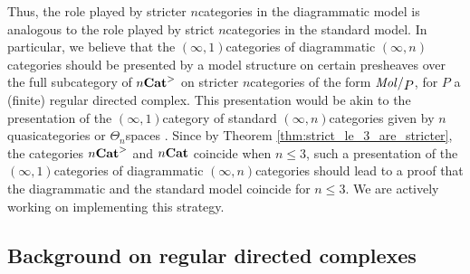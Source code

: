 \noindent Thus, the role played by stricter \( n \)\nbd categories in the diagrammatic model is analogous to the role played by strict \( n \)\nbd categories in the standard model.
In particular, we believe that the \( (\infty, 1) \)\nbd categories of diagrammatic \( (\infty, n) \)\nbd categories should be presented by a model structure on certain presheaves over the full subcategory of \( {n\mathbf{Cat}}^> \) on stricter \( n \)\nbd categories of the form \( \molecin{P} \), for \( P \) a (finite) regular directed complex.
This presentation would be akin to the presentation of the \( (\infty, 1) \)\nbd category of standard \( (\infty, n) \)\nbd categories given by \( n \)\nbd quasicategories \cite{ara2014higher} or \( \Theta_n \)\nbd spaces \cite{rezk2010cartesian}.     
Since by Theorem \ref{thm:strict_le_3_are_stricter}, the categories \( {n\mathbf{Cat}}^> \) and \( {n\mathbf{Cat}} \) coincide when \( n \le 3 \), such a presentation of the \( (\infty, 1) \)\nbd categories of diagrammatic \( (\infty, n) \)\nbd categories should lead to a proof that the diagrammatic and the standard model coincide for \( n \le 3 \).
We are actively working on implementing this strategy.

\subsection*{Background on regular directed complexes}

